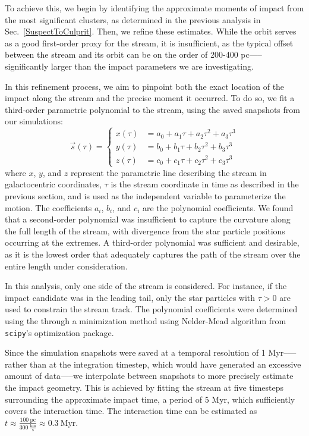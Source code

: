 \documentclass[draft]{aa}
\begin{document}
    To achieve this, we begin by identifying the approximate moments of impact from the most significant clusters, as determined in the previous analysis in Sec.~\ref{SuspectToCulprit}. Then, we refine these estimates. While the orbit serves as a good first-order proxy for the stream, it is insufficient, as the typical offset between the stream and its orbit can be on the order of 200-400 pc—--significantly larger than the impact parameters we are investigating.

    In this refinement process, we aim to pinpoint both the exact location of the impact along the stream and the precise moment it occurred. To do so, we fit a third-order parametric polynomial to the stream, using the saved snapshots from our simulations:
    \begin{equation}
      \vec{s}(\tau) = 
      \left\{
        \begin{aligned}
          x(\tau) &= a_0 + a_1 \tau + a_2 \tau^2 + a_3 \tau^3 \\ 
          y(\tau) &= b_0 + b_1 \tau + b_2 \tau^2 + b_3 \tau^3 \\
          z(\tau) &= c_0 + c_1 \tau + c_2 \tau^2 + c_3 \tau^3
        \end{aligned}
      \right.
      \end{equation}  
    where $x$, $y$, and $z$ represent the parametric line describing the stream in galactocentric coordinates, $\tau$ is the stream coordinate in time as described in the previous section, and is used as the independent variable to parameterize the motion. The coefficients $a_i$, $b_i$, and $c_i$ are the polynomial coefficients. We found that a second-order polynomial was insufficient to capture the curvature along the full length of the stream, with divergence from the star particle positions occurring at the extremes. A third-order polynomial was sufficient and desirable, as it is the lowest order that adequately captures the path of the stream over the entire length under consideration.

    In this analysis, only one side of the stream is considered. For instance, if the impact candidate was in the leading tail, only the star particles with $\tau > 0$ are used to constrain the stream track. The polynomial coefficients were determined using the through a minimization method using Nelder-Mead algorithm from \texttt{scipy}'s optimization package.

    Since the simulation snapshots were saved at a temporal resolution of 1 Myr--—rather than at the integration timestep, which would have generated an excessive amount of data—--we interpolate between snapshots to more precisely estimate the impact geometry. This is achieved by fitting the stream at five timesteps surrounding the approximate impact time, a period of 5 Myr, which sufficiently covers the interaction time. The interaction time can be estimated as $t \approx \frac{100~\text{pc}}{300~\frac{\text{km}}{\text{s}}} \approx 0.3~\text{Myr}$.
\end{document}
